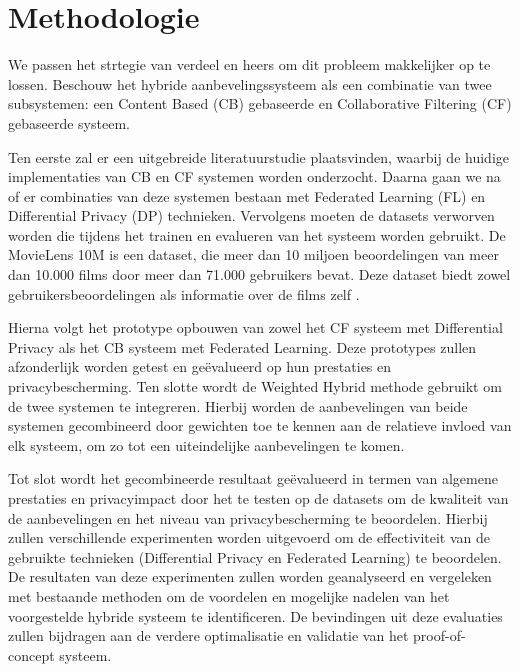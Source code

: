 
\section{Methodologie}%
\label{sec:methodologie}

We passen het strtegie van verdeel en heers om dit probleem makkelijker op te lossen. Beschouw het hybride aanbevelingssysteem als een combinatie van twee subsystemen: een Content Based (CB) gebaseerde en Collaborative Filtering (CF) gebaseerde systeem. 

Ten eerste zal er een uitgebreide literatuurstudie plaatsvinden, waarbij de huidige implementaties van CB en CF systemen worden onderzocht. Daarna gaan we na of er combinaties van deze systemen bestaan met Federated Learning (FL) en Differential Privacy (DP) technieken.
Vervolgens moeten de datasets verworven worden die tijdens het trainen en evalueren van het systeem worden gebruikt. De MovieLens 10M is een dataset, die meer dan 10 miljoen beoordelingen van meer dan 10.000 films door meer dan 71.000 gebruikers bevat. Deze dataset biedt zowel gebruikersbeoordelingen als informatie over de films zelf \autocite{Mazeh2020}.

Hierna volgt het prototype opbouwen van zowel het CF systeem met Differential Privacy als het CB systeem met Federated Learning. Deze prototypes zullen afzonderlijk worden getest en geëvalueerd op hun prestaties en privacybescherming. Ten slotte wordt de Weighted Hybrid methode gebruikt om de twee systemen te integreren. Hierbij worden de aanbevelingen van beide systemen gecombineerd door gewichten toe te kennen aan de relatieve invloed van elk systeem, om zo tot een uiteindelijke aanbevelingen te komen.

Tot slot wordt het gecombineerde resultaat geëvalueerd in termen van algemene prestaties en privacyimpact door het te testen op de datasets om de kwaliteit van de aanbevelingen en het niveau van privacybescherming te beoordelen. Hierbij zullen verschillende experimenten worden uitgevoerd om de effectiviteit van de gebruikte technieken (Differential Privacy en Federated Learning) te beoordelen. De resultaten van deze experimenten zullen worden geanalyseerd en vergeleken met bestaande methoden om de voordelen en mogelijke nadelen van het voorgestelde hybride systeem te identificeren. De bevindingen uit deze evaluaties zullen bijdragen aan de verdere optimalisatie en validatie van het proof-of-concept systeem.

